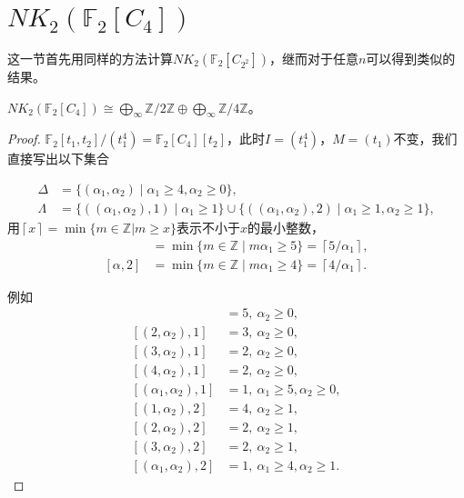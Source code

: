 % 
% 
% 
\section{$NK_2(\mathbb{F}_2[C_{4}])$}
这一节首先用同样的方法计算$NK_2(\mathbb{F}_2[C_{2^2}])$，继而对于任意$n$可以得到类似的结果。

\begin{theorem}
	$NK_2(\mathbb{F}_2[C_4])\cong \bigoplus_{\infty} \mathbb{Z}/2 \mathbb{Z}\oplus \bigoplus_{\infty}\mathbb{Z}/4 \mathbb{Z}$。
\end{theorem}
\begin{proof}
	$\mathbb{F}_2[t_1,t_2]/(t_1^4)=\mathbb{F}_2[C_{4}][t_2]$，此时$I=(t_1^4)$，$M=(t_1)$不变，我们直接写出以下集合

\begin{align*}
\Delta &=\{(\alpha_1,\alpha_2)\mid \alpha_1\geq 4, \alpha_2 \geq 0\},\\
\Lambda &=\{((\alpha_1,\alpha_2),1) \mid \alpha_1\geq 1\}\cup \{((\alpha_1,\alpha_2),2) \mid \alpha_1\geq 1, \alpha_2\geq 1\},
\end{align*}
用$\left \lceil x \right \rceil=\min \{m\in \mathbb{Z}|m\geq x\}$表示不小于$x$的最小整数，
\begin{align*}
[\alpha,1] & =\min \{m\in \mathbb{Z} \mid m \alpha_1\geq 5\}=\left \lceil 5/\alpha_1 \right \rceil,\\
[\alpha,2] & =\min \{m\in \mathbb{Z} \mid m \alpha_1\geq 4\}=\left \lceil 4/\alpha_1 \right \rceil.
\end{align*}

例如
\begin{align*}
[(1,\alpha_2),1] & = 5, \ \alpha_2\geq 0, \\
[(2,\alpha_2),1] & = 3, \ \alpha_2\geq 0, \\
[(3,\alpha_2),1] & = 2, \ \alpha_2\geq 0, \\
[(4,\alpha_2),1] & = 2, \ \alpha_2\geq 0, \\
[(\alpha_1,\alpha_2),1] & = 1, \ \alpha_1\geq 5, \alpha_2\geq 0, \\
[(1,\alpha_2),2] & = 4, \ \alpha_2\geq 1, \\
[(2,\alpha_2),2] & = 2, \ \alpha_2\geq 1, \\
[(3,\alpha_2),2] & = 2, \ \alpha_2\geq 1, \\
[(\alpha_1,\alpha_2),2] & = 1, \ \alpha_1\geq 4, \alpha_2\geq 1.
\end{align*}



\end{proof}
